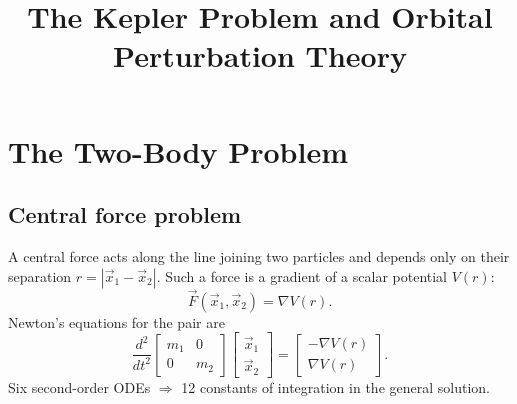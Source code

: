 \documentclass[11pt]{article}
\title{The Kepler Problem and Orbital Perturbation Theory}
\author{}
\date{}
\newcommand{\vecF}{\vec F}
\newcommand{\vecx}{\vec x}
\begin{document}
\maketitle

\tableofcontents

\section{The Two-Body Problem}

\subsection{Central force problem}
A central force acts along the line joining two particles and depends only on their separation $r=|\vecx_1-\vecx_2|$. Such a force is a gradient of a scalar potential $V(r)$:
\[
\vecF(\vecx_1,\vecx_2) = \nabla V(r).
\]
Newton's equations for the pair are
\begin{equation}
\frac{d^2}{dt^2}\begin{bmatrix}m_1 & 0\\0&m_2\end{bmatrix}\begin{bmatrix}\vecx_1\\\vecx_2\end{bmatrix}
=\begin{bmatrix}-\nabla V(r)\\ \nabla V(r)\end{bmatrix}. \label{eq:eom2}
\end{equation}
Six second-order ODEs $\Rightarrow$ 12 constants of integration in the general solution.
\end{document}
